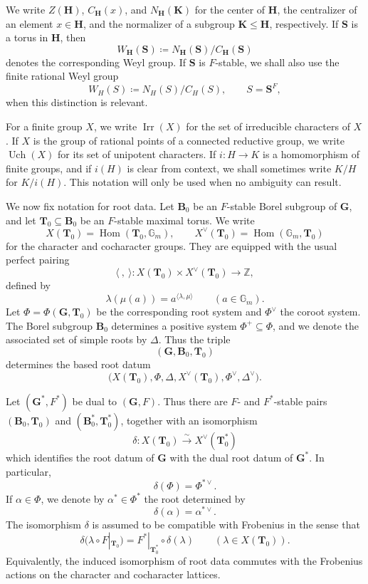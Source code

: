 \documentclass{amsart}
\theoremstyle{plain}
\numberwithin{equation}{section}
\theoremstyle{definition}
\newcommand{\Hom}{\operatorname{Hom}}
\newcommand{\Irr}{\operatorname{Irr}}
\newcommand{\Uch}{\operatorname{Uch}}
\newcommand{\bG}{\mathbf{G}}
\newcommand{\bT}{\mathbf{T}}
\newcommand{\bB}{\mathbf{B}}
\newcommand{\bH}{\mathbf{H}}
\newcommand{\bK}{\mathbf{K}}
\newcommand{\bS}{\mathbf{S}}
\begin{document}
We write \(Z(\bH)\), \(C_{\bH}(x)\), and \(N_{\bH}(\bK)\) for the center of
\(\bH\), the centralizer of an element \(x\in\bH\), and the normalizer of a
subgroup \(\bK\leq\bH\), respectively.  If \(\bS\) is a torus in \(\bH\), then
\[
W_{\bH}(\bS)\coloneqq N_{\bH}(\bS)/C_{\bH}(\bS)
\]
denotes the corresponding Weyl group.  If \(\bS\) is \(F\)-stable, we shall
also use the finite rational Weyl group
\[
W_H(S)\coloneqq N_H(S)/C_H(S),
\qquad S=\bS^F,
\]
when this distinction is relevant.

For a finite group \(X\), we write \(\Irr(X)\) for the set of irreducible
characters of \(X\).  If \(X\) is the group of rational points of a connected
reductive group, we write \(\Uch(X)\) for its set of unipotent characters.  If
\(i:H\to K\) is a homomorphism of finite groups, and if \(i(H)\) is clear from
context, we shall sometimes write \(K/H\) for \(K/i(H)\).  This notation will
only be used when no ambiguity can result.

We now fix notation for root data.  Let \(\bB_0\) be an \(F\)-stable Borel
subgroup of \(\bG\), and let \(\bT_0\subseteq\bB_0\) be an \(F\)-stable maximal
torus.  We write
\[
X(\bT_0)=\Hom(\bT_0,\mathbb G_m),
\qquad
X^\vee(\bT_0)=\Hom(\mathbb G_m,\bT_0)
\]
for the character and cocharacter groups.  They are equipped with the usual
perfect pairing
\[
\langle\ ,\ \rangle:
X(\bT_0)\times X^\vee(\bT_0)\longrightarrow \mathbb Z,
\]
defined by
\[
\lambda(\mu(a))=a^{\langle \lambda,\mu\rangle}
\qquad
(a\in\mathbb G_m).
\]
Let \(\Phi=\Phi(\bG,\bT_0)\) be the corresponding root system and
\(\Phi^\vee\) the coroot system.  The Borel subgroup \(\bB_0\) determines a
positive system \(\Phi^+\subseteq\Phi\), and we denote the associated set of
simple roots by \(\Delta\).  Thus the triple
\[
(\bG,\bB_0,\bT_0)
\]
determines the based root datum
\[
\bigl(
X(\bT_0),\Phi,\Delta,
X^\vee(\bT_0),\Phi^\vee,\Delta^\vee
\bigr).
\]

Let \((\bG^*,F^*)\) be dual to \((\bG,F)\).  Thus there are \(F\)- and
\(F^*\)-stable pairs \((\bB_0,\bT_0)\) and \((\bB_0^*,\bT_0^*)\), together with
an isomorphism
\[
\delta:X(\bT_0)\xrightarrow{\sim} X^\vee(\bT_0^*)
\]
which identifies the root datum of \(\bG\) with the dual root datum of
\(\bG^*\).  In particular,
\[
\delta(\Phi)=\Phi^{*\vee}.
\]
If \(\alpha\in\Phi\), we denote by \(\alpha^*\in\Phi^*\) the root determined by
\[
\delta(\alpha)=\alpha^{*\vee}.
\]
The isomorphism \(\delta\) is assumed to be compatible with Frobenius in the
sense that
\[
\delta(\lambda\circ F|_{\bT_0})
=
F^*|_{\bT_0^*}\circ \delta(\lambda)
\qquad
(\lambda\in X(\bT_0)).
\]
Equivalently, the induced isomorphism of root data commutes with the Frobenius
actions on the character and cocharacter lattices.
\end{document}
